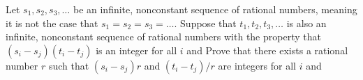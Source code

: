 Let $s_1, s_2, s_3, \dots$ be an infinite, nonconstant sequence of rational numbers, meaning it is not the case that $s_1 = s_2 = s_3 = \dots.$  Suppose that $t_1, t_2, t_3, \dots$ is also an infinite, nonconstant sequence of rational numbers with the property that $(s_i - s_j)(t_i - t_j)$ is an integer for all $i$ and   Prove that there exists a rational number $r$ such that $(s_i - s_j)r$ and $(t_i - t_j)/r$ are integers for all $i$ and 